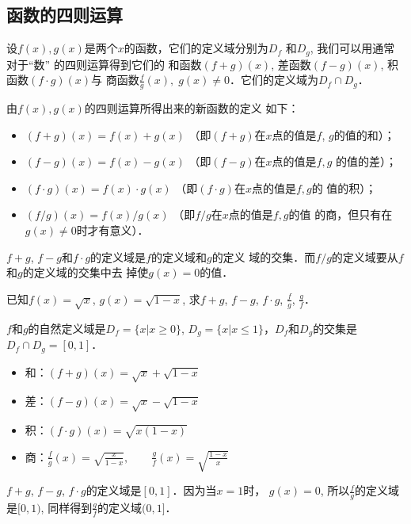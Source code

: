 \subsection{函数的四则运算}

设$f(x),g(x)$是两个$x$的函数，它们的定义域分别为$D_f$
和$D_g$, 我们可以用通常对于“数”
的四则运算得到它们的
和函数$(f+g)(x)$, 差函数$(f-g)(x)$, 积函数$(f\cdot g)(x)$与
商函数$\frac{f}{g}(x),\; g(x)\ne 0$．它们的定义域为$D_f\cap D_g$．

由$f(x),g(x)$的四则运算所得出来的新函数的定义
如下：
\begin{itemize}
    \item $(f+g)(x)=f(x)+g(x)$ （即$(f+g)$在$x$点的值是$f$,
$g$的值的和）；
\item $(f-g)(x)=f(x)-g(x)$ （即$(f-g)$在$x$点的值是$f,g$
的值的差）；
\item $(f\cdot g)(x)=f(x)\cdot g(x)$ （即$(f\cdot g)$在$x$点的值是$f,g$的
值的积）；
\item $(f/g)(x)=f(x)/g(x)$ （即$f/g$在$x$点的值是$f,g$的值
的商，但只有在$g(x)\ne 0$时才有意义）．
\end{itemize}

$f+g$, $f-g$和$f\cdot g$的定义域是$f$的定义域和$g$的定义
域的交集．而$f/g$的定义域要从$f$和$g$的定义域的交集中去
掉使$g(x)=0$的值．

\begin{example}
    已知$f(x)=\sqrt{x}$, $g(x)=\sqrt{1-x}$, 求$f+g$,
$f-g$, $f\cdot g$, $\frac{f}{g}$, $\frac{g}{f}$．
\end{example}

\begin{solution}
    $f$和$g$的自然定义域是$D_f=\{x|x\ge 0\}$, $D_g=\{x|x\le 1\}$，$D_f$和$D_g$的交集是$D_f\cap D_g=[0,1]$．
\begin{itemize}
    \item 和：$(f+g)(x)=\sqrt{x}+\sqrt{1-x}$
    \item 差：$(f-g)(x)=\sqrt{x}-\sqrt{1-x}$
    \item  积：$(f\cdot g)(x)=\sqrt{x(1-x)}$
    \item 商：$\frac{f}{g}(x)=\sqrt{\frac{x}{1-x}},\qquad \frac{g}{f}(x)=\sqrt{\frac{1-x}{x}}$
\end{itemize}

$f+g$, $f-g$, $f\cdot g$的定义域是$[0,1]$．因为当$x=1$时，
$g(x)=0$, 所以$\frac{f}{g}$的定义域是$[0,1)$, 同样得到$\frac{g}{f}$的定义域$(0,1]$．
\end{solution}

